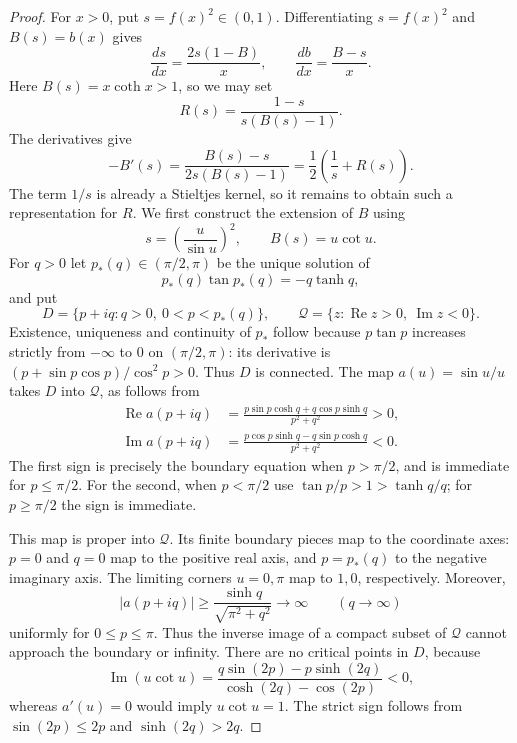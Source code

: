 \documentclass[11pt]{article}
\theoremstyle{remark}\newtheorem{remark}[theorem]{Remark}
\begin{document}
\begin{proof}
For $x>0$, put $s=f(x)^2\in(0,1)$. Differentiating $s=f(x)^2$ and
$B(s)=b(x)$ gives
\[
 \frac{ds}{dx}=\frac{2s(1-B)}{x},\qquad
 \frac{db}{dx}=\frac{B-s}{x}.
\]
Here $B(s)=x\coth x>1$, so we may set
\[
 R(s)=\frac{1-s}{s(B(s)-1)}.
\]
The derivatives give
\begin{equation}\label{int:B-derivative}
 -B'(s)=\frac{B(s)-s}{2s(B(s)-1)}
       =\frac12\left(\frac1s+R(s)\right).
\end{equation}
The term $1/s$ is already a Stieltjes kernel, so it remains to obtain
such a representation for $R$. We first construct the extension of $B$
using
\begin{equation}\label{int:u-parametrization}
 s=\left(\frac{u}{\sin u}\right)^2,\qquad B(s)=u\cot u.
\end{equation}
For $q>0$ let $p_*(q)\in(\pi/2,\pi)$ be the unique solution of
\[
 p_*(q)\tan p_*(q)=-q\tanh q,
\]
and put
\[
 D=\{p+iq:q>0,\ 0<p<p_*(q)\},\qquad
 \mathcal Q=\{z:\operatorname{Re}z>0,\ \operatorname{Im}z<0\}.
\]
Existence, uniqueness and continuity of $p_*$ follow because
$p\tan p$ increases strictly from $-\infty$ to $0$ on $(\pi/2,\pi)$:
its derivative is $(p+\sin p\cos p)/\cos^2p>0$.
Thus $D$ is connected.  The map $a(u)=\sin u/u$ takes $D$ into
$\mathcal Q$, as follows from
\begin{align*}
 \operatorname{Re}a(p+iq)
 &=\frac{p\sin p\cosh q+q\cos p\sinh q}{p^2+q^2}>0,\\
 \operatorname{Im}a(p+iq)
 &=\frac{p\cos p\sinh q-q\sin p\cosh q}{p^2+q^2}<0.
\end{align*}
The first sign is precisely the boundary equation when $p>\pi/2$,
and is immediate for $p\le\pi/2$.  For the second, when $p<\pi/2$ use
$\tan p/p>1>\tanh q/q$; for $p\ge\pi/2$ the sign is immediate.

This map is proper into $\mathcal Q$.  Its finite boundary pieces map
to the coordinate axes: $p=0$ and $q=0$ map to the positive real axis,
and $p=p_*(q)$ to the negative imaginary axis.  The limiting corners
$u=0,\pi$ map to $1,0$, respectively.  Moreover,
\[
 |a(p+iq)|\ge\frac{\sinh q}{\sqrt{\pi^2+q^2}}\longrightarrow\infty
 \qquad(q\longrightarrow\infty)
\]
uniformly for $0\le p\le\pi$.  Thus the inverse image of a compact
subset of $\mathcal Q$ cannot approach the boundary or infinity.
There are no critical points in $D$, because
\begin{equation}\label{int:anti-pick-sign}
 \operatorname{Im}(u\cot u)
 =\frac{q\sin(2p)-p\sinh(2q)}{\cosh(2q)-\cos(2p)}<0,
\end{equation}
whereas $a'(u)=0$ would imply $u\cot u=1$.
The strict sign follows from $\sin(2p)\le2p$ and $\sinh(2q)>2q$.


\end{proof}
\end{document}
